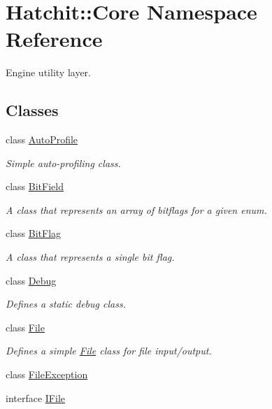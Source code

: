 \hypertarget{namespaceHatchit_1_1Core}{}\section{Hatchit\+:\+:Core Namespace Reference}
\label{namespaceHatchit_1_1Core}


Engine utility layer.  


\subsection*{Classes}
\begin{DoxyCompactItemize}
\item 
class \hyperlink{classHatchit_1_1Core_1_1AutoProfile}{Auto\+Profile}
\begin{DoxyCompactList}\small\item\em Simple auto-\/profiling class. \end{DoxyCompactList}\item 
class \hyperlink{classHatchit_1_1Core_1_1BitField}{Bit\+Field}
\begin{DoxyCompactList}\small\item\em A class that represents an array of bitflags for a given enum. \end{DoxyCompactList}\item 
class \hyperlink{classHatchit_1_1Core_1_1BitFlag}{Bit\+Flag}
\begin{DoxyCompactList}\small\item\em A class that represents a single bit flag. \end{DoxyCompactList}\item 
class \hyperlink{classHatchit_1_1Core_1_1Debug}{Debug}
\begin{DoxyCompactList}\small\item\em Defines a static debug class. \end{DoxyCompactList}\item 
class \hyperlink{classHatchit_1_1Core_1_1File}{File}
\begin{DoxyCompactList}\small\item\em Defines a simple \hyperlink{classHatchit_1_1Core_1_1File}{File} class for file input/output. \end{DoxyCompactList}\item 
class \hyperlink{classHatchit_1_1Core_1_1FileException}{File\+Exception}
\item 
interface \hyperlink{classHatchit_1_1Core_1_1IFile}{I\+File}

\end{DoxyCompactItemize}
